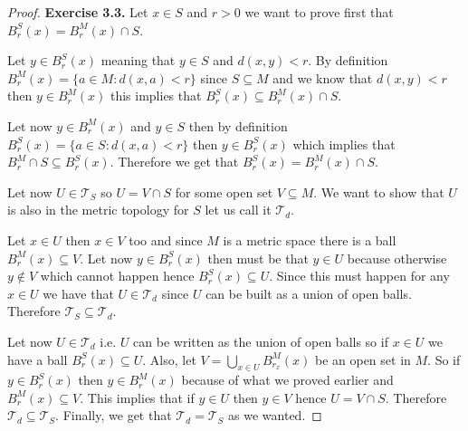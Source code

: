 \documentclass[11pt]{article}
\newcommand{\Topo}{\mathcal{T}}
\theoremstyle{definition}
\begin{document}
\begin{proof}{\textbf{Exercise 3.3.}}
    Let $x \in S$ and $r > 0$ we want to prove first that
    $B_r^S(x) = B_r^M(x) \cap S$.

    Let $y \in B_r^S(x)$ meaning that $y \in S$ and $d(x,y) < r$.
    By definition $B_r^M(x) = \{a \in M: d(x,a) < r\}$ since $S \subseteq M$
    and we know that $d(x,y) < r$ then $y \in B_r^M(x)$ this implies that
    $B_r^S(x) \subseteq B_r^M(x) \cap S$.

    Let now $y \in B_r^M(x)$ and $y \in S$ then by definition
    $B_r^S(x) = \{a \in S: d(x,a) < r\}$ then $y \in B_r^S(x)$ which implies
    that $B_r^M \cap S \subseteq B_r^S(x)$. Therefore we get that
    $B_r^S(x) = B_r^M(x) \cap S$.

    Let now $U \in \Topo_S$ so $U = V \cap S$ for some open set $V \subseteq M$.
    We want to show that $U$ is also in the metric topology for $S$ let us
    call it $\Topo_d$.

    Let $x \in U$ then $x \in V$ too and since $M$ is a metric space there is
    a ball $B_r^M(x) \subseteq V$. Let now $y \in B_r^S(x)$
    then must be that $y \in U$ because otherwise $y \not\in V$ which
    cannot happen hence $B_r^S(x) \subseteq U$.
    Since this must happen for any $x \in U$ we have that
    $U \in \Topo_d$ since $U$ can be built as a union of open
    balls. Therefore $\Topo_S \subseteq \Topo_d$.

    Let now $U \in \Topo_d$ i.e. $U$ can be written as the union of open balls
    so if $x \in U$ we have a ball $B_r^S(x) \subseteq U$.
    Also, let $V = \bigcup_{x \in U} B_{r_x}^M(x)$ be an open set in $M$.
    So if $y \in B_r^S(x)$ then $y \in B_r^M(x)$ because of what we proved earlier
    and $B_r^M(x) \subseteq V$.
    This implies that if $y \in U$ then $y \in V$ hence $U = V \cap S$.
    Therefore $\Topo_d \subseteq \Topo_S$.
    Finally, we get that $\Topo_d = \Topo_S$ as we wanted.
\end{proof}
\cleardoublepage
\end{document}

